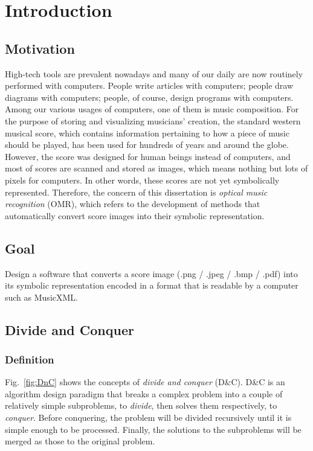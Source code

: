 \chapter{Introduction}
\label{c:intro}

\section{Motivation}
\label{section:motivation}
High-tech tools are prevalent nowadays and many of our daily are now routinely performed with computers. People write articles with computers; people draw diagrams with computers; people, of course, design programs with computers. Among our various usages of computers, one of them is music composition. For the purpose of storing and visualizing musicians' creation, the standard western musical score, which contains information pertaining to how a piece of music should be played, has been used for hundreds of years and around the globe. However, the score was designed for human beings instead of computers, and most of scores are scanned and stored as images, which means nothing but lots of pixels for computers. In other words, these scores are not yet symbolically represented. Therefore, the concern of this dissertation is \emph{optical music recognition} (OMR), which refers to the development of methods that automatically convert score images into their symbolic representation.

\section{Goal}
\label{section:goal}
Design a software that converts a score image (.png / .jpeg / .bmp / .pdf) into its symbolic representation encoded in a format that is readable by a computer such as MusicXML.

\section{Divide and Conquer}
\subsection{Definition}
\label{section:divide-and-conquer}

Fig.~\ref{fig:DnC} shows the concepts of \emph{divide and conquer} (D\&C). D\&C is an algorithm design paradigm that breaks a complex problem into a couple of relatively simple subproblems, to \emph{divide}, then solves them respectively, to \emph{conquer}. Before conquering, the problem will be divided recursively until it is simple enough to be processed. Finally, the solutions to the subproblems will be merged as those to the original problem.


